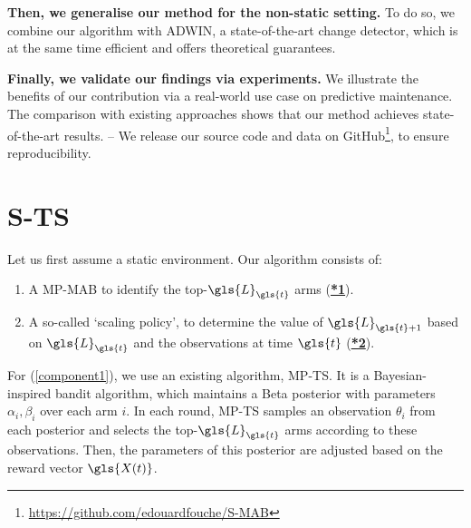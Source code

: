 \textbf{Then, we generalise our method for the non-static setting.} To do so, we combine our algorithm with \gls{ADWIN}, a state-of-the-art change detector, which is at the same time efficient and offers theoretical guarantees. 

\textbf{Finally, we validate our findings via experiments.} We illustrate the benefits of our contribution via a real-world use case on predictive maintenance. The comparison with existing approaches shows that our method achieves state-of-the-art results. 
-- We release our source code and data on GitHub\footnote{\url{https://github.com/edouardfouche/S-MAB}}, to ensure reproducibility.

\section{\acrlong{S-TS}}
\label{sec:STS}

Let us first assume a static environment. Our algorithm consists of: 
\begin{enumerate}[noitemsep]
	\item A \gls{MP-MAB} to identify the top-$\gls{L}_{\gls{t}}$ arms (\hyperlink{*1}{\textbf{*1}}). \label{component1}
	\item A so-called `scaling policy', to determine the value of $\gls{L}_{\gls{t}+1}$ based on $\gls{L}_{\gls{t}}$ and the observations at time $\gls{t}$ (\hyperlink{*2}{\textbf{*2}}). \label{component2}
\end{enumerate}

For (\ref{component1}), we use an existing algorithm, \gls{MP-TS}. It is a Bayesian-inspired bandit algorithm, which maintains a Beta posterior with parameters $\alpha_i, \beta_i$ over each arm $i$. In each round, \gls{MP-TS} samples an observation $\theta_i$ from each posterior and selects the top-$\gls{L}_{\gls{t}}$ arms according to these observations. Then, the parameters of this posterior are adjusted based on the reward vector $\gls{X(t)}$. 


